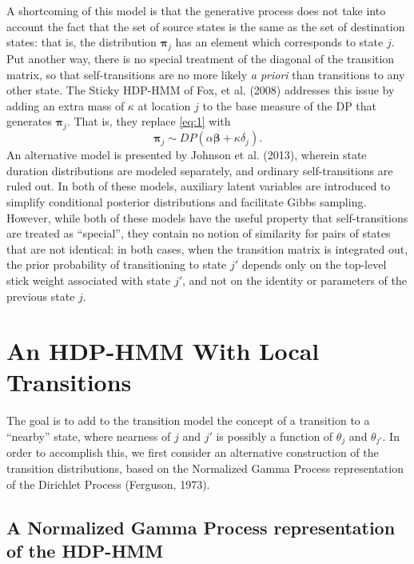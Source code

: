 \documentclass[12pt,letterpaper]{report}
\newcommand{\bbeta}{\boldsymbol{\beta}}
\newcommand{\bpi}{\boldsymbol{\pi}}
\begin{document}
A shortcoming of this model is that the generative process does not
take into account the fact that the set of source states is the same
as the set of destination states: that is, the distribution $\bpi_j$
has an element which corresponds to state $j$.  Put another way, there
is no special treatment of the diagonal of the transition matrix, so
that self-transitions are no more likely {\it a priori} than
transitions to any other state.  The Sticky HDP-HMM of Fox, et
al. (2008) addresses this issue by adding an extra mass of $\kappa$ at location $j$ to the base
measure of the DP that generates $\bpi_j$.  That is, they replace
\eqref{eq:1} with
\begin{equation}
  \label{eq:6}
  \bpi_j \sim DP(\alpha\bbeta + \kappa \delta_j).
\end{equation}
An alternative model is presented by Johnson et al. (2013), wherein 
state duration distributions are modeled
separately, and ordinary self-transitions are ruled out.  In both of
these models, auxiliary latent variables are introduced to simplify
conditional posterior distributions and facilitate Gibbs sampling.
However, while both of these models have the useful property that
self-transitions are treated as ``special'', they contain no notion of
similarity for pairs of states that are not identical: 
in both cases, when the transition matrix
is integrated out, the prior probability of
transitioning to state $j'$ depends only on the top-level stick
weight associated with state $j'$, and not on the identity or
parameters of the previous state $j$.

\section{An HDP-HMM With Local Transitions}

The goal is to add to the transition model the concept of a transition to
a ``nearby'' state, where nearness of $j$ and $j'$ is possibly a function of
$\theta_j$ and $\theta_{j'}$.  In order to accomplish this, we first
consider an alternative construction of the transition distributions,
based on the Normalized Gamma Process representation of the Dirichlet
Process (Ferguson, 1973).

\subsection{A Normalized Gamma Process representation of the HDP-HMM}
\label{sec:normalized-gamma}
\end{document}
